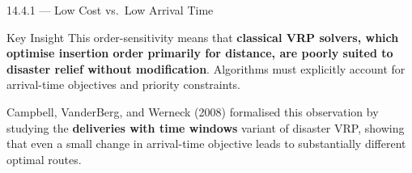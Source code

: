 \documentclass[aspectratio=169,10pt]{beamer}
\begin{document}
\begin{frame}[allowframebreaks]{14.4.1 --- Low Cost vs.\ Low Arrival Time}
  \medskip
  \begin{alertblock}{Key Insight}
    This order-sensitivity means that \textbf{classical VRP solvers,
    which optimise insertion order primarily for distance, are poorly
    suited to disaster relief without modification}.
    Algorithms must explicitly account for arrival-time objectives
    and priority constraints.
  \end{alertblock}

  \medskip
  Campbell, VanderBerg, and Werneck (2008) formalised this observation
  by studying the \textbf{deliveries with time windows} variant of
  disaster VRP, showing that even a small change in arrival-time
  objective leads to substantially different optimal routes.
\end{frame}

\end{document}
